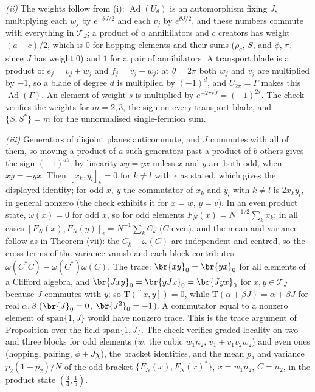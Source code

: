 \emph{(ii)} The weights follow from (i): $\operatorname{Ad}(U_{\theta})$ is an automorphism fixing $J$, multiplying each $w_{j}$ by $e^{-\theta J/2}$ and each $v_{j}$ by $e^{\theta J/2}$, and these numbers commute with everything in $\mathcal{T}_{J}$; a product of $a$ annihilators and $c$ creators has weight $(a - c)/2$, which is $0$ for hopping elements and their sums ($\rho_{q}$, $S$, and $\phi$, $\pi$, since $J$ has weight $0$) and $1$ for a pair of annihilators. A transport blade is a product of $e_{j} = v_{j} + w_{j}$ and $f_{j} = v_{j} - w_{j}$; at $\theta = 2\pi$ both $w_{j}$ and $v_{j}$ are multiplied by $-1$, so a blade of degree $d$ is multiplied by $(-1)^{d}$, and $U_{2\pi} = \Gamma$ makes this $\operatorname{Ad}(\Gamma)$. An element of weight $s$ is multiplied by $e^{-2\pi sJ} = (-1)^{2s}$. The check verifies the weights for $m = 2, 3$, the sign on every transport blade, and $\{S, S^{*}\} = m$ for the unnormalised single-fermion sum.

\emph{(iii)} Generators of disjoint planes anticommute, and $J$ commutes with all of them, so moving a product of $a$ such generators past a product of $b$ others gives the sign $(-1)^{ab}$; by linearity $xy = yx$ unless $x$ and $y$ are both odd, when $xy = -yx$. Then $[x_{k}, y_{l}]_{\epsilon} = 0$ for $k \ne l$ with $\epsilon$ as stated, which gives the displayed identity; for odd $x$, $y$ the commutator of $x_{k}$ and $y_{l}$ with $k \ne l$ is $2x_{k}y_{l}$, in general nonzero (the check exhibits it for $x = w$, $y = v$). In an even product state, $\omega(x) = 0$ for odd $x$, so for odd elements $F_{N}(x) = N^{-1/2}\sum_{k}x_{k}$; in all cases $[F_{N}(x), F_{N}(y)]_{\epsilon} = N^{-1}\sum_{k}C_{k}$ ($C$ even), and the mean and variance follow as in Theorem (vii): the $C_{k} - \omega(C)$ are independent and centred, so the cross terms of the variance vanish and each block contributes $\omega(C^{*}C) - \omega(C^{*})\omega(C)$. The trace: $\br{xy}_{0} = \br{yx}_{0}$ for all elements of a Clifford algebra, and $\br{Jxy}_{0} = \br{yJx}_{0} = \br{Jyx}_{0}$ for $x, y \in \mathcal{T}_{J}$ because $J$ commutes with $y$; so $\mathrm{T}([x, y]) = 0$, while $\mathrm{T}(\alpha + \beta J) = \alpha + \beta J$ for real $\alpha, \beta$ ($\br{J}_{0} = 0$, $\br{J^{2}}_{0} = -1$). A commutator equal to a nonzero element of $\mathrm{span}\{1, J\}$ would have nonzero trace. This is the trace argument of Proposition  over the field $\mathrm{span}\{1, J\}$. The check verifies graded locality on two and three blocks for odd elements ($w$, the cubic $w_{1}n_{2}$, $v_{1} + v_{1}v_{2}w_{2}$) and even ones (hopping, pairing, $\phi + J\chi$), the bracket identities, and the mean $p_{2}$ and variance $p_{2}(1 - p_{2})/N$ of the odd bracket $\{F_{N}(x), F_{N}(x)^{*}\}$, $x = w_{1}n_{2}$, $C = n_{2}$, in the product state $(\tfrac34, \tfrac15)$.

